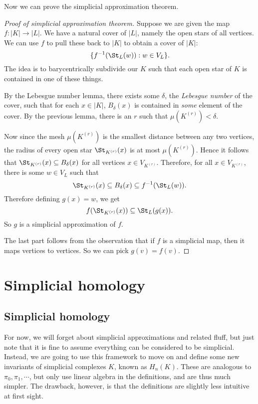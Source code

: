 \documentclass[a4paper]{article}
\begin{document}
Now we can prove the simplicial approximation theorem.

\begin{proof}[Proof of simplicial approximation theorem]
  Suppose we are given the map $f: |K| \to |L|$. We have a natural cover of $|L|$, namely the open stars of all vertices. We can use $f$ to pull these back to $|K|$ to obtain a cover of $|K|$:
  \[
    \{f^{-1}(\St_L(w)) : w \in V_L\}.
  \]
  The idea is to barycentrically subdivide our $K$ such that each open star of $K$ is contained in one of these things.

  By the Lebesgue number lemma, there exists some $\delta$, the \emph{Lebesgue number} of the cover, such that for each $x \in |K|$, $B_\delta(x)$ is contained in \emph{some} element of the cover. By the previous lemma, there is an $r$ such that $\mu(K^{(r)}) < \delta$.

  Now since the mesh $\mu(K^{(r)})$ is the smallest distance between any two vertices, the radius of every open star $\St_{K^{(r)}}(x)$ is at most $\mu(K^{(r)})$. Hence it follows that $\St_{K^{(r)}}(x) \subseteq B_\delta(x)$ for all vertices $x \in V_{K^{(r)}}$. Therefore, for all $x \in V_{K^{(r)}}$, there is some $w \in V_L$ such that
  \[
    \St_{K^{(r)}}(x) \subseteq B_\delta(x) \subseteq f^{-1}(\St_L(w)).
  \]
  Therefore defining $g(x) = w$, we get
  \[
    f(\St_{K^{(r)}}(x)) \subseteq \St_L(g(x)).
  \]
  So $g$ is a simplicial approximation of $f$.

  The last part follows from the observation that if $f$ is a simplicial map, then it maps vertices to vertices. So we can pick $g(v) = f(v)$.
\end{proof}

\section{Simplicial homology}
\subsection{Simplicial homology}
For now, we will forget about simplicial approximations and related fluff, but just note that it is fine to assume everything can be considered to be simplicial. Instead, we are going to use this framework to move on and define some new invariants of simplicial complexes $K$, known as $H_n(K)$. These are analogous to $\pi_0, \pi_1, \cdots$, but only use linear algebra in the definitions, and are thus much simpler. The drawback, however, is that the definitions are slightly less intuitive at first sight.
\end{document}
